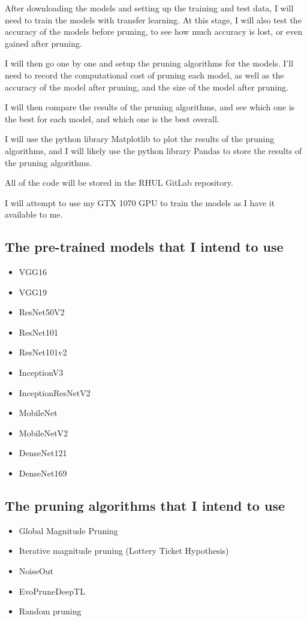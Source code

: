 \documentclass{article}
\begin{document}
After downloading the models and setting up the training and test data, I will need to
train the models with transfer learning. At this stage, I will also test the accuracy of the
models before pruning, to see how much accuracy is lost, or even gained after pruning.

I will then go one by one and setup the pruning algorithms for the models.
I'll need to record the computational cost of pruning each model, as well as the
accuracy of the model after pruning, and the size of the model after pruning.

I will then compare the results of the pruning algorithms, and see which one is the best
for each model, and which one is the best overall.

I will use the python library Matplotlib\cite{Matplotlib} to plot the results of the pruning algorithms,
and I will likely use the python library Pandas\cite{Pandas} to store the results of the pruning algorithms.

All of the code will be stored in the RHUL GitLab\cite{RHULGitLab} repository.

I will attempt to use my GTX 1070 GPU\cite{GTX1070} to train the models as I have it available to me.



\pagebreak

\subsection{The pre-trained models that I intend to use}
\begin{itemize}
	\item VGG16
	\item VGG19
	\item ResNet50V2
	\item ResNet101
	\item ResNet101v2
	\item InceptionV3
	\item InceptionResNetV2
	\item MobileNet
	\item MobileNetV2
	\item DenseNet121
	\item DenseNet169
\end{itemize}

\subsection{The pruning algorithms that I intend to use}
\begin{itemize}
	\item Global Magnitude Pruning \cite{gupta2022global}
	\item Iterative magnitude pruning (Lottery Ticket Hypothesis)\cite{LotteryTicket}
	\item NoiseOut\cite{DBLP:journals/corr/BabaeizadehSC16}
	\item EvoPruneDeepTL \cite{DBLP:journals/corr/abs-2202-03844}
	\item Random pruning
\end{itemize}
\end{document}
